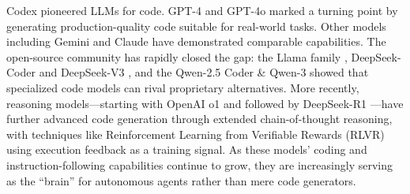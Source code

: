 \documentclass[11pt]{article}
\begin{document}
Codex \citep{chen2021evaluating} pioneered LLMs for code. GPT-4 \citep{achiam2023gpt} and GPT-4o \citep{hurst2024gpt} marked a turning point by generating production-quality code suitable for real-world tasks. Other models including Gemini \citep{team2023gemini} and Claude \citep{anthropic2024claude3} have demonstrated comparable capabilities. The open-source community has rapidly closed the gap: the Llama family \citep{roziere2023code, dubey2024llama}, DeepSeek-Coder \citep{guo2024deepseek} and DeepSeek-V3 \citep{liu2024deepseek}, and the Qwen-2.5 Coder \citep{hui2024qwen2} \& Qwen-3 \citep{yang2025qwen3} showed that specialized code models can rival proprietary alternatives. More recently, reasoning models---starting with OpenAI o1 \citep{jaech2024openai} and followed by DeepSeek-R1 \citep{guo2025deepseek}---have further advanced code generation through extended chain-of-thought reasoning, with techniques like Reinforcement Learning from Verifiable Rewards (RLVR) \citep{wang2025reinforcementlearningreasoninglarge} using execution feedback as a training signal. As these models' coding and instruction-following capabilities continue to grow, they are increasingly serving as the ``brain'' for autonomous agents rather than mere code generators.
\end{document}
